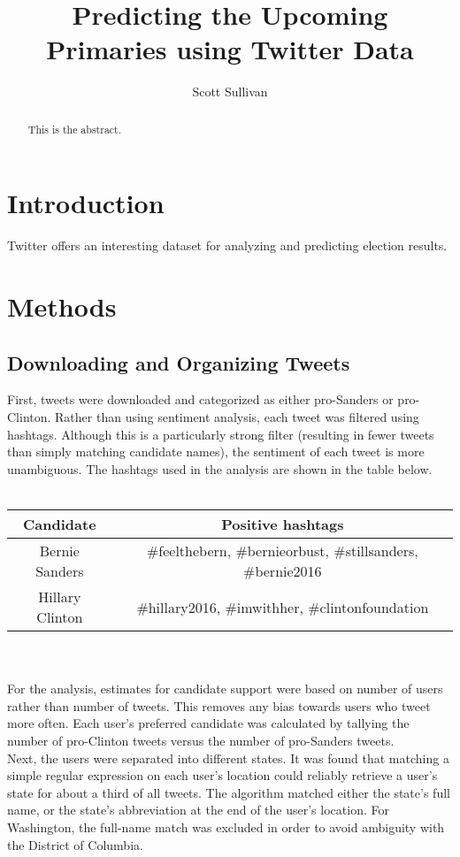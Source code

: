 \documentclass[12pt]{extarticle}
\title{
{\LARGE \bfseries Predicting the Upcoming Primaries using Twitter Data}
}
\author{Scott Sullivan}
\begin{document}
\maketitle

\begin{abstract}
This is the abstract.

\end{abstract}

\newpage

\section{Introduction}
Twitter offers an interesting dataset for analyzing and predicting election results.

\section{Methods}
\subsection{Downloading and Organizing Tweets}
First, tweets were downloaded and categorized as either pro-Sanders or pro-Clinton.
Rather than using sentiment analysis, each tweet was filtered using hashtags.
Although this is a particularly strong filter (resulting in fewer tweets than simply matching candidate names), the sentiment of each tweet is more unambiguous.
The hashtags used in the analysis are shown in the table below.
\\
\\
\begin{centering}
	\begin{tabular}{|c|c|} \hline
    Candidate & Positive hashtags \\ \hline 
    Bernie Sanders & \#feelthebern, \#bernieorbust, \#stillsanders, \#bernie2016 \\ \hline
    Hillary Clinton & \#hillary2016, \#imwithher, \#clintonfoundation \\ \hline
  \end{tabular}
\end{centering}
\\
\\
For the analysis, estimates for candidate support were based on number of users rather than number of tweets.
This removes any bias towards users who tweet more often.
Each user's preferred candidate was calculated by tallying the number of pro-Clinton tweets versus the number of pro-Sanders tweets.
\\
\indent
Next, the users were separated into different states.
It was found that matching a simple regular expression on each user's location could reliably retrieve a user's state for about a third of all tweets.
The algorithm matched either the state's full name, or the state's abbreviation at the end of the user's location.
For Washington, the full-name match was excluded in order to avoid ambiguity with the District of Columbia.
\end{document}
